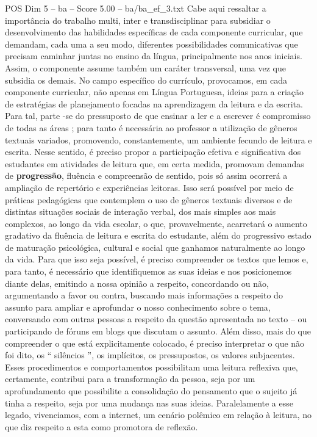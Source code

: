 \begin{textsample}{POS Dim 5 – ba – Score 5.00 – ba/ba\_ef\_3.txt}
Cabe aqui ressaltar a importância do trabalho multi, inter e transdisciplinar para subsidiar o desenvolvimento das habilidades específicas de cada componente curricular, que demandam, cada uma a seu modo, diferentes possibilidades comunicativas que precisam caminhar juntas no ensino da língua, principalmente nos anos iniciais.
Assim, o componente assume também um caráter transversal, uma vez que subsidia os demais.
No campo específico do currículo, provocamos, em cada componente curricular, não apenas em Língua Portuguesa, ideias para a criação de estratégias de planejamento focadas na aprendizagem da leitura e da escrita.
Para tal, parte -se do pressuposto de que ensinar a ler e a escrever é compromisso de todas as áreas ; para tanto é necessária ao professor a utilização de gêneros textuais variados, promovendo, constantemente, um ambiente fecundo de leitura e escrita.
Nesse sentido, é preciso propor a participação efetiva e significativa dos estudantes em atividades de leitura que, em certa medida, promovam demandas de \textbf{progressão}, fluência e compreensão de sentido, pois só assim ocorrerá a ampliação de repertório e experiências leitoras.
Isso será possível por meio de práticas pedagógicas que contemplem o uso de gêneros textuais diversos e de distintas situações sociais de interação verbal, dos mais simples aos mais complexos, ao longo da vida escolar, o que, provavelmente, acarretará o aumento gradativo da fluência de leitura e escrita do estudante, além do progressivo estado de maturação psicológica, cultural e social que ganhamos naturalmente ao longo da vida.
Para que isso seja possível, é preciso compreender os textos que lemos e, para tanto, é necessário que identifiquemos as suas ideias e nos posicionemos diante delas, emitindo a nossa opinião a respeito, concordando ou não, argumentando a favor ou contra, buscando mais informações a respeito do assunto para ampliar e aprofundar o nosso conhecimento sobre o tema, conversando com outras pessoas a respeito da questão apresentada no texto – ou participando de fóruns em blogs que discutam o assunto.
Além disso, mais do que compreender o que está explicitamente colocado, é preciso interpretar o que não foi dito, os “ silêncios ”, os implícitos, os pressupostos, os valores subjacentes.
Esses procedimentos e comportamentos possibilitam uma leitura reflexiva que, certamente, contribui para a transformação da pessoa, seja por um aprofundamento que possibilite a consolidação do pensamento que o sujeito já tinha a respeito, seja por uma mudança nas suas ideias.
Paralelamente a esse legado, vivenciamos, com a internet, um cenário polêmico em relação à leitura, no que diz respeito a esta como promotora de reflexão.

\end{textsample}
